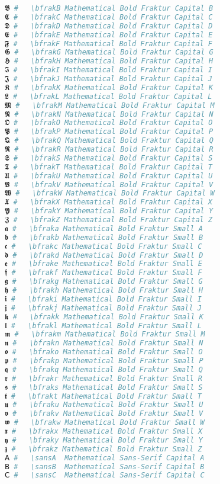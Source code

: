 \begin{lstlisting}[language=Julia, style=julia]
𝕭 #   \bfrakB Mathematical Bold Fraktur Capital B
𝕮 #   \bfrakC Mathematical Bold Fraktur Capital C
𝕯 #   \bfrakD Mathematical Bold Fraktur Capital D
𝕰 #   \bfrakE Mathematical Bold Fraktur Capital E
𝕱 #   \bfrakF Mathematical Bold Fraktur Capital F
𝕲 #   \bfrakG Mathematical Bold Fraktur Capital G
𝕳 #   \bfrakH Mathematical Bold Fraktur Capital H
𝕴 #   \bfrakI Mathematical Bold Fraktur Capital I
𝕵 #   \bfrakJ Mathematical Bold Fraktur Capital J
𝕶 #   \bfrakK Mathematical Bold Fraktur Capital K
𝕷 #   \bfrakL Mathematical Bold Fraktur Capital L
𝕸 #   \bfrakM Mathematical Bold Fraktur Capital M
𝕹 #   \bfrakN Mathematical Bold Fraktur Capital N
𝕺 #   \bfrakO Mathematical Bold Fraktur Capital O
𝕻 #   \bfrakP Mathematical Bold Fraktur Capital P
𝕼 #   \bfrakQ Mathematical Bold Fraktur Capital Q
𝕽 #   \bfrakR Mathematical Bold Fraktur Capital R
𝕾 #   \bfrakS Mathematical Bold Fraktur Capital S
𝕿 #   \bfrakT Mathematical Bold Fraktur Capital T
𝖀 #   \bfrakU Mathematical Bold Fraktur Capital U
𝖁 #   \bfrakV Mathematical Bold Fraktur Capital V
𝖂 #   \bfrakW Mathematical Bold Fraktur Capital W
𝖃 #   \bfrakX Mathematical Bold Fraktur Capital X
𝖄 #   \bfrakY Mathematical Bold Fraktur Capital Y
𝖅 #   \bfrakZ Mathematical Bold Fraktur Capital Z
𝖆 #   \bfraka Mathematical Bold Fraktur Small A
𝖇 #   \bfrakb Mathematical Bold Fraktur Small B
𝖈 #   \bfrakc Mathematical Bold Fraktur Small C
𝖉 #   \bfrakd Mathematical Bold Fraktur Small D
𝖊 #   \bfrake Mathematical Bold Fraktur Small E
𝖋 #   \bfrakf Mathematical Bold Fraktur Small F
𝖌 #   \bfrakg Mathematical Bold Fraktur Small G
𝖍 #   \bfrakh Mathematical Bold Fraktur Small H
𝖎 #   \bfraki Mathematical Bold Fraktur Small I
𝖏 #   \bfrakj Mathematical Bold Fraktur Small J
𝖐 #   \bfrakk Mathematical Bold Fraktur Small K
𝖑 #   \bfrakl Mathematical Bold Fraktur Small L
𝖒 #   \bfrakm Mathematical Bold Fraktur Small M
𝖓 #   \bfrakn Mathematical Bold Fraktur Small N
𝖔 #   \bfrako Mathematical Bold Fraktur Small O
𝖕 #   \bfrakp Mathematical Bold Fraktur Small P
𝖖 #   \bfrakq Mathematical Bold Fraktur Small Q
𝖗 #   \bfrakr Mathematical Bold Fraktur Small R
𝖘 #   \bfraks Mathematical Bold Fraktur Small S
𝖙 #   \bfrakt Mathematical Bold Fraktur Small T
𝖚 #   \bfraku Mathematical Bold Fraktur Small U
𝖛 #   \bfrakv Mathematical Bold Fraktur Small V
𝖜 #   \bfrakw Mathematical Bold Fraktur Small W
𝖝 #   \bfrakx Mathematical Bold Fraktur Small X
𝖞 #   \bfraky Mathematical Bold Fraktur Small Y
𝖟 #   \bfrakz Mathematical Bold Fraktur Small Z
𝖠 #   \sansA  Mathematical Sans-Serif Capital A
𝖡 #   \sansB  Mathematical Sans-Serif Capital B
𝖢 #   \sansC  Mathematical Sans-Serif Capital C

\end{lstlisting}
